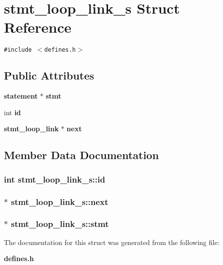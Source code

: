 \section{stmt\_\-loop\_\-link\_\-s  Struct Reference}
\label{structstmt__loop__link__s}
{\tt \#include $<$defines.h$>$}

\subsection*{Public Attributes}
\begin{CompactItemize}
\item 
{\bf statement} $\ast$ {\bf stmt}
\item 
int {\bf id}
\item 
{\bf stmt\_\-loop\_\-link} $\ast$ {\bf next}
\end{CompactItemize}


\subsection{Member Data Documentation}
\subsubsection{\setlength{\rightskip}{0pt plus 5cm}int stmt\_\-loop\_\-link\_\-s::id}\label{structstmt__loop__link__s_m1}


\subsubsection{$\ast$ stmt\_\-loop\_\-link\_\-s::next}\label{structstmt__loop__link__s_m2}


\subsubsection{$\ast$ stmt\_\-loop\_\-link\_\-s::stmt}\label{structstmt__loop__link__s_m0}




The documentation for this struct was generated from the following file:\begin{CompactItemize}
\item 
{\bf defines.h}\end{CompactItemize}
